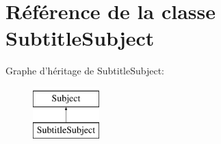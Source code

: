 \hypertarget{classSubtitleSubject}{\section{Référence de la classe Subtitle\+Subject}
\label{classSubtitleSubject}
}
Graphe d'héritage de Subtitle\+Subject\+:\begin{figure}[H]
\begin{center}
\leavevmode
\includegraphics[height=2.000000cm]{classSubtitleSubject}
\end{center}
\end{figure}
